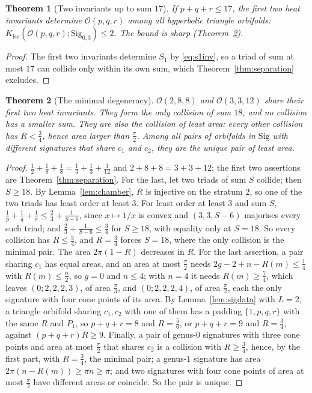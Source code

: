 \documentclass[pdflatex,sn-mathphys-num]{sn-jnl}
\theoremstyle{thmstyleone}%
\newtheorem{theorem}{Theorem}[section]%
\theoremstyle{thmstylethree}%
\newcommand{\Orb}{\mathcal{O}}
\newcommand{\Sig}{\mathrm{Sig}}
\newcommand{\Kiso}{K_{\mathrm{iso}}}
\begin{document}
\begin{theorem}[Two invariants up to sum $17$]\label{thm:threshold}
If $p+q+r\le17$, the first two heat invariants determine $\Orb(p,q,r)$ among all hyperbolic triangle orbifolds: $\Kiso(\Orb(p,q,r);\Sig_{0,3})\le2$. The bound is sharp (Theorem~\ref{thm:minimal}).
\end{theorem}

\begin{proof}
The first two invariants determine $S_1$ by \eqref{eq:s1inv}, so a triad of sum at most $17$ can collide only within its own sum, which Theorem~\ref{thm:separation} excludes.
\end{proof}

\begin{theorem}[The minimal degeneracy]\label{thm:minimal}
$\Orb(2,8,8)$ and $\Orb(3,3,12)$ share their first two heat invariants. They form the only collision of sum $18$, and no collision has a smaller sum. They are also the collision of least area: every other collision has $R<\frac34$, hence area larger than $\frac\pi2$. Among all pairs of orbifolds in $\Sig$ with different signatures that share $c_1$ and $c_2$, they are the unique pair of least area.
\end{theorem}

\begin{proof}
$\frac12+\frac18+\frac18=\frac13+\frac13+\frac1{12}$ and $2+8+8=3+3+12$; the first two assertions are Theorem~\ref{thm:separation}. For the last, let two triads of sum $S$ collide; then $S\ge18$. By Lemma~\ref{lem:chamber}, $R$ is injective on the stratum $2$, so one of the two triads has least order at least $3$. For least order at least $3$ and sum $S$, $\frac1p+\frac1q+\frac1r\le\frac23+\frac1{S-6}$, since $x\mapsto1/x$ is convex and $(3,3,S-6)$ majorises every such triad; and $\frac23+\frac1{S-6}\le\frac34$ for $S\ge18$, with equality only at $S=18$. So every collision has $R\le\frac34$, and $R=\frac34$ forces $S=18$, where the only collision is the minimal pair. The area $2\pi(1-R)$ decreases in $R$. For the last assertion, a pair sharing $c_1$ has equal areas, and an area at most $\frac\pi2$ needs $2g-2+n-R(m)\le\frac14$ with $R(m)\le\frac n2$, so $g=0$ and $n\le4$; with $n=4$ it needs $R(m)\ge\frac74$, which leaves $(0;2,2,2,3)$, of area $\frac\pi3$, and $(0;2,2,2,4)$, of area $\frac\pi2$, each the only signature with four cone points of its area. By Lemma~\ref{lem:sigdata} with $L=2$, a triangle orbifold sharing $c_1,c_2$ with one of them has a padding $\{1,p,q,r\}$ with the same $R$ and $P_1$, so $p+q+r=8$ and $R=\frac56$, or $p+q+r=9$ and $R=\frac34$, against $(p+q+r)R\ge9$. Finally, a pair of genus-$0$ signatures with three cone points and area at most $\frac\pi2$ that shares $c_2$ is a collision with $R\ge\frac34$, hence, by the first part, with $R=\frac34$, the minimal pair; a genus-$1$ signature has area $2\pi(n-R(m))\ge\pi n\ge\pi$; and two signatures with four cone points of area at most $\frac\pi2$ have different areas or coincide. So the pair is unique.
\end{proof}
\end{document}
